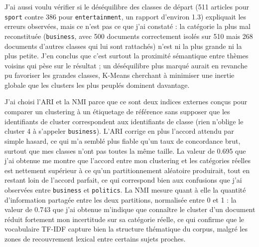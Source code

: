 \documentclass[11pt,a4paper]{article}
\begin{document}
J'ai aussi voulu vérifier si le déséquilibre des classes de départ (511
articles pour \texttt{sport} contre 386 pour \texttt{entertainment}, un
rapport d'environ 1.3) expliquait les erreurs observées, mais ce n'est pas
ce que j'ai constaté : la catégorie la plus mal reconstituée
(\texttt{business}, avec 500 documents correctement isolés sur 510 mais 268
documents d'autres classes qui lui sont rattachés) n'est ni la plus grande
ni la plus petite. J'en conclus que c'est surtout la proximité sémantique
entre thèmes voisins qui pèse sur le résultat ; un déséquilibre plus marqué
aurait en revanche pu favoriser les grandes classes, K-Means cherchant à
minimiser une inertie globale que les clusters les plus peuplés dominent
davantage.

J'ai choisi l'ARI et la NMI parce que ce sont deux indices externes conçus
pour comparer un clustering à un étiquetage de référence sans supposer que
les identifiants de cluster correspondent aux identifiants de classe (rien
n'oblige le cluster 4 à s'appeler \texttt{business}). L'ARI corrige en plus
l'accord attendu par simple hasard, ce qui m'a semblé plus fiable qu'un
taux de concordance brut, surtout que mes classes n'ont pas toutes la même
taille. La valeur de 0.695 que j'ai obtenue me montre que l'accord entre
mon clustering et les catégories réelles est nettement supérieur à ce
qu'un partitionnement aléatoire produirait, tout en restant loin de
l'accord parfait, ce qui correspond bien aux confusions que j'ai observées
entre \texttt{business} et \texttt{politics}. La NMI mesure quant à elle la
quantité d'information partagée entre les deux partitions, normalisée
entre 0 et 1 : la valeur de 0.743 que j'ai obtenue m'indique que connaître
le cluster d'un document réduit fortement mon incertitude sur sa catégorie
réelle, ce qui confirme que le vocabulaire TF-IDF capture bien la
structure thématique du corpus, malgré les zones de recouvrement lexical
entre certains sujets proches.
\end{document}
